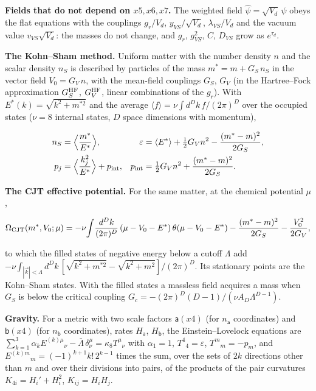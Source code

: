 \documentclass[
  10pt,
]{article}
\begin{document}
\textbf{Fields that do not depend on \(x5,x6,x7\).} The weighted field
\(\hat\psi=\sqrt{V_d}\,\psi\) obeys the flat equations with the
couplings \(g_r/V_d\), \(y_{VS}/\sqrt{V_d}\), \(\lambda_{VS}/V_d\) and
the vacuum value \(v_{VS}\sqrt{V_d}\): the masses do not change, and
\(g_r\), \(g_{VS}^2\), \(C\), \(D_{VS}\) grow as \(e^{\tau_d}\).

\textbf{The Kohn--Sham method.} Uniform matter with the number density
\(n\) and the scalar density \(n_S\) is described by particles of the
mass \(m^*=m+G_S\,n_S\) in the vector field \(V_0=G_V\,n\), with the
mean-field couplings \(G_S\), \(G_V\) (in the Hartree--Fock
approximation \(G_S^{\rm HF}\), \(G_V^{\rm HF}\), linear combinations of
the \(g_r\)). With \(E^*(k)=\sqrt{k^2+m^{*2}}\) and the average
\(\langle f\rangle=\nu\int d^Dk\,f/(2\pi)^D\) over the occupied states
(\(\nu=8\) internal states, \(D\) space dimensions with momentum),

\[\begin{aligned}
n_S&=\Big\langle\frac{m^*}{E^*}\Big\rangle,&
\varepsilon&=\langle E^*\rangle+\tfrac12G_Vn^2-\frac{(m^*-m)^2}{2G_S},\\
p_j&=\Big\langle\frac{k_j^2}{E^*}\Big\rangle+p_{\rm int},&
p_{\rm int}&=\tfrac12G_Vn^2+\frac{(m^*-m)^2}{2G_S}.
\end{aligned}\]

\textbf{The CJT effective potential.} For the same matter, at the
chemical potential \(\mu\),

\[\Omega_{\rm CJT}(m^*,V_0;\mu)=-\nu\!\int\!\frac{d^Dk}{(2\pi)^D}\,(\mu-V_0-E^*)\,\theta(\mu-V_0-E^*)
-\frac{(m^*-m)^2}{2G_S}-\frac{V_0^2}{2G_V},\]

to which the filled states of negative energy below a cutoff \(\Lambda\)
add
\(-\nu\int_{|\vec k|<\Lambda}d^Dk\,[\sqrt{k^2+m^{*2}}-\sqrt{k^2+m^2}]/(2\pi)^D\).
Its stationary points are the Kohn--Sham states. With the filled states
a massless field acquires a mass when \(G_S\) is below the critical
coupling \(G_c=-(2\pi)^D(D-1)/(\nu A_D\Lambda^{D-1})\).

\textbf{Gravity.} For a metric with two scale factors \(\mathsf a(x4)\)
(for \(n_{\mathsf a}\) coordinates) and \(\mathsf b(x4)\) (for
\(n_{\mathsf b}\) coordinates), rates \(H_{\mathsf a}\),
\(H_{\mathsf b}\), the Einstein--Lovelock equations are
\(\sum_{k=1}^3\alpha_kE^{(k)\mu}{}_\nu-\bar\Lambda\,\delta^\mu_\nu=\kappa_8T^\mu{}_\nu\)
with \(\alpha_1=1\), \(T^4{}_4=\varepsilon\), \(T^m{}_m=-p_m\), and
\(E^{(k)m}{}_m=(-1)^{k+1}k!\,2^{k-1}\) times the sum, over the sets of
\(2k\) directions other than \(m\) and over their divisions into pairs,
of the products of the pair curvatures \(K_{4i}=H_i'+H_i^2\),
\(K_{ij}=H_iH_j\).
\end{document}
